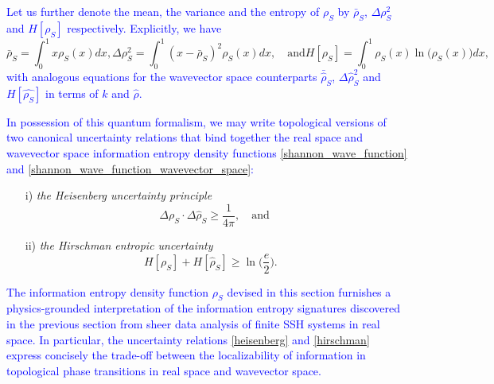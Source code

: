 \documentclass[10pt]{revtex4-1}
\begin{document}
\textcolor{blue}{
Let us further denote the mean, the variance and the entropy of $\rho_S$ by $\bar{\rho}_S$, $\Delta \rho_S^2 $ and $H[\rho_S]$ respectively. Explicitly, we have }
\begin{subequations}
\label{statistics}
\begin{equation}
\label{mean}
\bar{\rho}_S = \int_0^1x\rho_S(x)dx,
\end{equation}
\begin{equation}
\label{variance}
\Delta\rho_S^2 = \int_0^1(x-\bar{\rho}_S)^2\rho_S(x)dx,\quad \text{and}
\end{equation}
\begin{equation}
\label{entropy}
H[\rho_S] = \int_0^1\rho_S(x)\ln\big(\rho_S(x)\big) dx,
\end{equation}
\end{subequations}
\textcolor{blue}{
with analogous equations for the wavevector space counterparts $\bar{\hat{\rho}}_S$, $\Delta \hat{\rho}_S^2 $ and $H[\hat{\rho_S}]$ in terms of $k$ and $\hat{\rho}$.}

\textcolor{blue}{
In possession of this quantum formalism, we may write topological versions of two canonical uncertainty relations that bind together the real space and wavevector space information entropy density functions \eqref{shannon_wave_function} and \eqref{shannon_wave_function_wavevector_space}: }

\begin{enumerate}
\item[i)] \emph{the Heisenberg uncertainty principle}
\begin{equation}
\label{heisenberg}
\Delta\rho_S \cdot \Delta\hat{\rho}_S \geq \frac{1}{4\pi}, \quad \text{and }
\end{equation}
\item[ii)] \emph{the Hirschman entropic uncertainty}
\begin{equation}
\label{hirschman}
H[\rho_S] + H[\hat{\rho}_S] \geq \ln\Big(\frac{e}{2}\Big). \quad
\end{equation}
\end{enumerate}

\textcolor{blue}{
The information entropy density function $\rho_S$ devised in this section furnishes a physics-grounded interpretation of the information entropy signatures discovered in the previous section from sheer data analysis of finite SSH systems in real space. In particular, the uncertainty relations \eqref{heisenberg} and \eqref{hirschman} express concisely the trade-off between the localizability of information in topological phase transitions in real space and wavevector space. 
}
\end{document}
